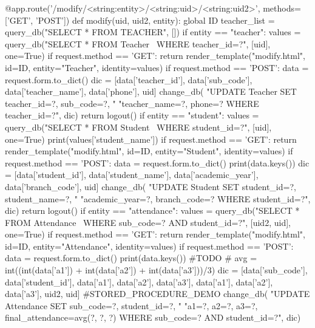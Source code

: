\begin{python}
@app.route('/modify/<string:entity>/<string:uid>/<string:uid2>',
           methods=['GET', 'POST'])
def modify(uid, uid2, entity):
    global ID
    teacher_list = query_db("SELECT * FROM TEACHER", [])
    if entity == "teacher":
        values = query_db("SELECT * FROM Teacher \
                            WHERE teacher_id=?", [uid], one=True)
        if request.method == 'GET':
            return render_template("modify.html", id=ID,
                                   entity="Teacher",  identity=values)
        if request.method == 'POST':
            data = request.form.to_dict()
            dic = [data['teacher_id'], data['sub_code'],
                    data['teacher_name'], data['phone'], uid]
            change_db(
                "UPDATE Teacher SET teacher_id=?, sub_code=?,  "
                "teacher_name=?, phone=? WHERE teacher_id=?", dic)
            return logout()
    if entity == "student":
        values = query_db("SELECT * FROM Student \
                            WHERE student_id=?", [uid], one=True)
        print(values['student_name'])
        if request.method == 'GET':
            return render_template("modify.html", id=ID,
                                   entity="Student", identity=values)
        if request.method == 'POST':
            data = request.form.to_dict()
            print(data.keys())
            dic = [data['student_id'], data['student_name'],
                    data['academic_year'], data['branch_code'], uid]
            change_db(
                "UPDATE Student SET student_id=?, student_name=?,  "
                "academic_year=?, branch_code=? WHERE student_id=?", dic)
            return logout()
    if entity == "attendance":
        values = query_db("SELECT * FROM Attendance \
                            WHERE sub_code=? AND student_id=?", [uid2, uid], one=True)
        if request.method == 'GET':
            return render_template("modify.html", id=ID,
                                   entity="Attendance", identity=values)
        if request.method == 'POST':
            data = request.form.to_dict()
            print(data.keys())
            #TODO
            # avg = int((int(data['a1']) + int(data['a2']) + int(data['a3']))/3)
            dic = [data['sub_code'], data['student_id'],
                    data['a1'], data['a2'], data['a3'], data['a1'], data['a2'], data['a3'], uid2, uid]
            #STORED_PROCEDURE_DEMO
            change_db(
                "UPDATE Attendance SET sub_code=?, student_id=?, "
                "a1=?, a2=?, a3=?, final_attendance=avg(?, ?, ?)  WHERE sub_code=? AND student_id=?", dic)

\end{python}
